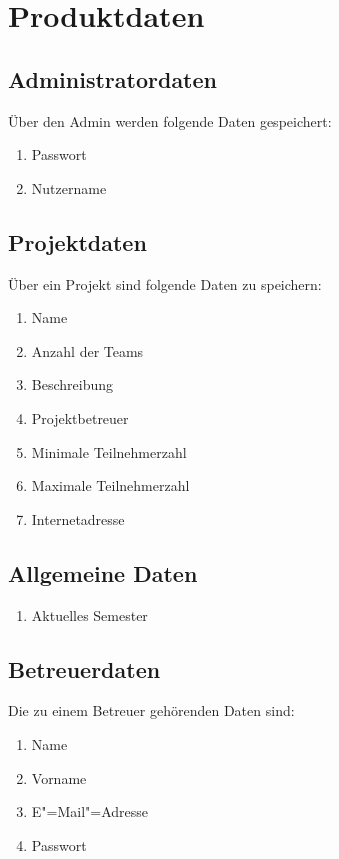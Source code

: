 \documentclass[parskip=full]{scrartcl}
\newcommand{\swtLabel}[1]{\textbf{/#1\arabic*0/}}
\begin{document}
\section{Produktdaten}

\subsection{Administratordaten}
Über den \gls{Admin} werden folgende Daten gespeichert:
\begin{enumerate}[label=\swtLabel{D}] 
	\item Passwort
	\item Nutzername
\end{enumerate}

\subsection{Projektdaten}
Über ein Projekt sind folgende Daten zu speichern:
\begin{enumerate}[label=\swtLabel{D},resume] 
  \item Name
  \item Anzahl der Teams
  \item Beschreibung
  \item Projektbetreuer
  \item Minimale Teilnehmerzahl
  \item Maximale Teilnehmerzahl
  \item Internetadresse
\end{enumerate}
 
\subsection{Allgemeine Daten}
\begin{enumerate}[label=\swtLabel{D},resume]
  \item Aktuelles Semester
\end{enumerate}

\subsection{Betreuerdaten}
Die zu einem Betreuer gehörenden Daten sind:
\begin{enumerate}[label=\swtLabel{D}, resume] 
	\item Name
	\item Vorname
	\item E"=Mail"=Adresse
	\item Passwort
\end{enumerate}
\end{document}
